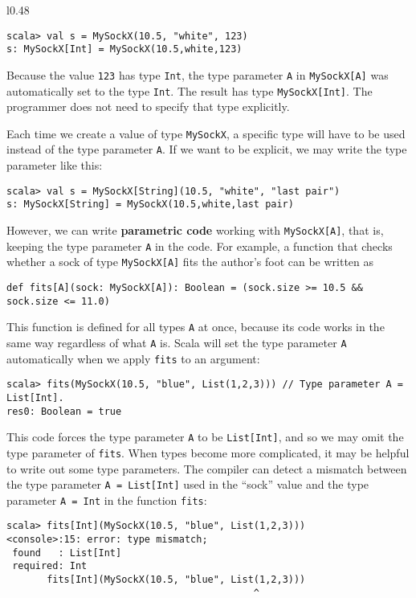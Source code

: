 \begin{wrapfigure}{l}{0.48\columnwidth}%
\vspace{-0.75\baselineskip}
\begin{lstlisting}
scala> val s = MySockX(10.5, "white", 123)
s: MySockX[Int] = MySockX(10.5,white,123) 
\end{lstlisting}

\vspace{-1\baselineskip}
\end{wrapfigure}%

\noindent Because the value \lstinline!123! has type \lstinline!Int!,
the type parameter \lstinline!A! in \lstinline!MySockX[A]! was automatically
set to the type \lstinline!Int!. The result has type \lstinline!MySockX[Int]!.
The programmer does not need to specify that type explicitly.

Each time we create a value of type \lstinline!MySockX!, a specific
type will have to be used instead of the type parameter \lstinline!A!.
If we want to be explicit, we may write the type parameter like this:
\begin{lstlisting}
scala> val s = MySockX[String](10.5, "white", "last pair")
s: MySockX[String] = MySockX(10.5,white,last pair) 
\end{lstlisting}
However, we can write \textbf{parametric code}
working with \lstinline!MySockX[A]!, that is, keeping the type parameter
\lstinline!A! in the code. For example, a function that checks whether
a sock of type \lstinline!MySockX[A]! fits the author's foot can
be written as
\begin{lstlisting}
def fits[A](sock: MySockX[A]): Boolean = (sock.size >= 10.5 && sock.size <= 11.0)
\end{lstlisting}
This function is defined for all types \lstinline!A! at once, because
its code works in the same way regardless of what \lstinline!A! is.
Scala will set the type parameter \lstinline!A! automatically when
we apply \lstinline!fits! to an argument:
\begin{lstlisting}
scala> fits(MySockX(10.5, "blue", List(1,2,3))) // Type parameter A = List[Int].
res0: Boolean = true
\end{lstlisting}
This code forces the type parameter \lstinline!A! to be \lstinline!List[Int]!,
and so we may omit the type parameter of \lstinline!fits!. When types
become more complicated, it may be helpful to write out some type
parameters. The compiler can detect a mismatch between the type parameter
\lstinline!A = List[Int]! used in the ``sock'' value and the type
parameter \lstinline!A = Int! in the function \lstinline!fits!:
\begin{lstlisting}
scala> fits[Int](MySockX(10.5, "blue", List(1,2,3)))
<console>:15: error: type mismatch;
 found   : List[Int]
 required: Int
       fits[Int](MySockX(10.5, "blue", List(1,2,3)))
                                           ^ 
\end{lstlisting}

